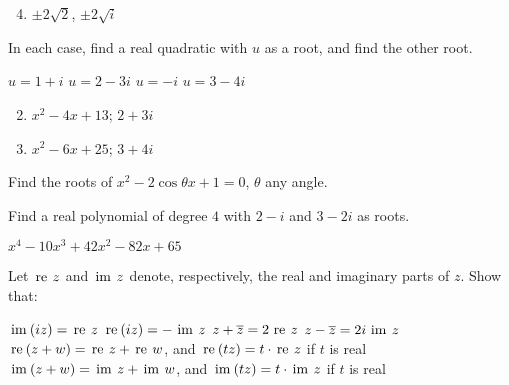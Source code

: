 \begin{multicols}{2}
\begin{ex}
\begin{sol}
\begin{enumerate}[label={\alph*.}]
\setcounter{enumi}{3}
\item  $\pm 2\sqrt{2}$, $\pm 2\sqrt{i}$


\end{enumerate}
\end{sol}
\end{ex}

\begin{ex}
In each case, find a real quadratic with $u$ as a root, and find the other root.

\begin{exenumerate}
\exitem  $u = 1 + i$
\exitem  $u = 2 - 3i$
\exitem $u = -i$
\exitem $u = 3 - 4i$
\end{exenumerate}
\begin{sol}
\begin{enumerate}[label={\alph*.}]
\setcounter{enumi}{1}
\item  $x^{2} - 4x + 13$; $2 + 3i$

\setcounter{enumi}{3}
\item  $x^{2} - 6x + 25$; $3 + 4i$

\end{enumerate}
\end{sol}
\end{ex}

\begin{ex}
Find the roots of $x^{2} - 2\cos \theta x + 1 = 0$, $\theta$ any angle.
\end{ex}

\begin{ex}
Find a real polynomial of degree $4$ with $2 - i$ and $3 - 2i$ as roots.

\begin{sol}
$x^{4} - 10x^{3} + 42x^{2} - 82x + 65$
\end{sol}
\end{ex}

\begin{ex}
Let $\thinspace\operatorname{re \medspace}z$ and $\thinspace\operatorname{im \medspace}z$ denote, respectively, the real and imaginary parts of $z$. Show that:

\begin{exenumerate}
\exitem $\thinspace\operatorname{im\medspace}(iz) = \thinspace\operatorname{re \medspace}z$
\exitem $\thinspace\operatorname{re\medspace}(iz) = -\thinspace\operatorname{im \medspace}z$
\exitem $z + \overline{z} = 2 \thinspace\operatorname{re\medspace}z$
\exitem $z - \overline{z} = 2i \thinspace\operatorname{im\medspace} z$
\exitem* $\thinspace\operatorname{re\medspace}(z + w) = \thinspace\operatorname{re \medspace}z + \thinspace\operatorname{re \medspace}w$, and $\thinspace\operatorname{re\medspace}(tz) = t \cdot \thinspace\operatorname{re \medspace}z$ if $t$ is real
\exitem* $\thinspace\operatorname{im\medspace}(z + w) = \thinspace\operatorname{im \medspace}z + \thinspace\operatorname{im \medspace}w$, and $\thinspace\operatorname{im\medspace}(tz) = t \cdot \thinspace\operatorname{im \medspace}z$ if $t$ is real
\end{exenumerate}
\end{ex}


\end{multicols}
